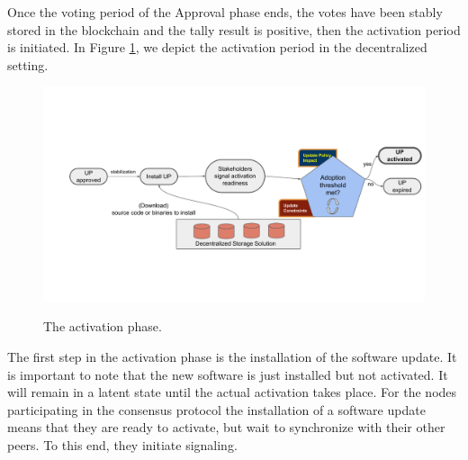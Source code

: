 Once the voting period of the Approval phase ends, the votes have been stably stored in the blockchain and the tally result is positive, then the activation period is initiated. In Figure \ref{activation}, we depict the activation period in the decentralized setting.
\begin{figure}[h!] %
    \caption{The activation phase.}
    \centering
    \includegraphics[width=1.0 \columnwidth,keepaspectratio]{figures/activation_phase.pdf}
    \label{activation}
\end{figure}
The first step in the activation phase is the installation of the software update. It is important to note that the new software is just installed but not activated. It will remain in a latent state until the actual activation takes place. For the nodes participating in the consensus protocol the installation of a software update means that they are ready to activate, but wait to synchronize with their other peers. To this end, they initiate signaling. %

